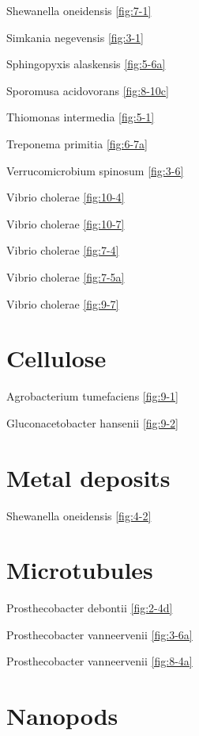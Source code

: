 \documentclass[]{tufte-book}
\begin{document}
Shewanella oneidensis \ref{fig:7-1}

Simkania negevensis \ref{fig:3-1}

Sphingopyxis alaskensis \ref{fig:5-6a}

Sporomusa acidovorans \ref{fig:8-10c}

Thiomonas intermedia \ref{fig:5-1}

Treponema primitia \ref{fig:6-7a}

Verrucomicrobium spinosum \ref{fig:3-6}

Vibrio cholerae \ref{fig:10-4}

Vibrio cholerae \ref{fig:10-7}

Vibrio cholerae \ref{fig:7-4}

Vibrio cholerae \ref{fig:7-5a}

Vibrio cholerae \ref{fig:9-7}

\hypertarget{cellulose-1}{%
\section*{Cellulose}\label{cellulose-1}}

Agrobacterium tumefaciens \ref{fig:9-1}

Gluconacetobacter hansenii \ref{fig:9-2}

\hypertarget{metal-deposits}{%
\section*{Metal deposits}\label{metal-deposits}}

Shewanella oneidensis \ref{fig:4-2}

\hypertarget{microtubules}{%
\section*{Microtubules}\label{microtubules}}

Prosthecobacter debontii \ref{fig:2-4d}

Prosthecobacter vanneervenii \ref{fig:3-6a}

Prosthecobacter vanneervenii \ref{fig:8-4a}

\hypertarget{nanopods}{%
\section*{Nanopods}\label{nanopods}}
\end{document}
